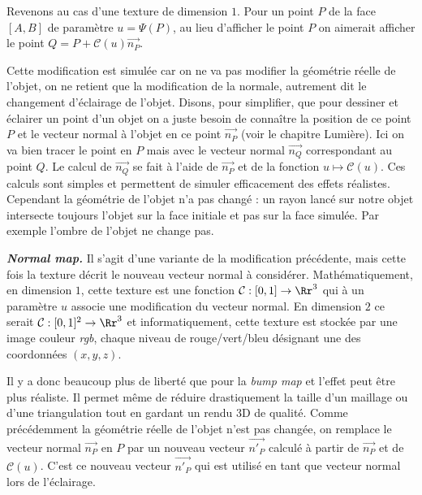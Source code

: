 \documentclass[11pt,class=report,crop=false]{standalone}
\begin{document}
Revenons au cas d'une texture de dimension $1$. Pour un point $P$ de la face $[A,B]$ de paramètre $u=\Psi(P)$, au lieu d'afficher le point $P$ on aimerait afficher le point $Q = P + \mathcal{C}(u) \vec{n_P}$.





Cette modification est \og{}simulée\fg{} car on ne va pas modifier la géométrie réelle de l'objet, on ne retient que la modification de la normale, autrement dit le changement d'éclairage de l'objet.
Disons, pour simplifier, que pour dessiner et éclairer un point d'un objet on a juste besoin de connaître la position de ce point $P$ et le vecteur normal à l'objet en ce point $\vec{n_P}$ (voir le chapitre \og{}Lumière\fg{}).
Ici on va bien tracer le point en $P$ mais avec le vecteur normal $\vec{n_{Q}}$ correspondant au point $Q$. 
Le calcul de  $\vec{n_{Q}}$ se fait à l'aide de $\vec{n_P}$ et de la fonction $u \mapsto \mathcal{C}(u)$.
Ces calculs sont simples et permettent de simuler efficacement des effets réalistes. 
Cependant la géométrie de l'objet n'a pas changé : un rayon lancé sur notre objet  intersecte toujours l'objet sur la face initiale et pas sur la face simulée.
Par exemple l'ombre de l'objet ne change pas.



\medskip

\textbf{\emph{Normal map.}}
Il s'agit d'une variante de la modification précédente, mais cette fois la texture décrit le nouveau vecteur normal à considérer.
Mathématiquement, en dimension $1$,  cette texture est une fonction $\mathcal{C} : [0,1] \to \Rr^3$ qui à un paramètre $u$ associe une modification du vecteur normal.
En dimension $2$ ce serait $\mathcal{C} : [0,1]^2 \to \Rr^3$ et informatiquement, cette texture est stockée par une image couleur \emph{rgb}, chaque niveau de rouge/vert/bleu désignant une des coordonnées $(x,y,z)$. 

Il y a donc beaucoup plus de liberté que pour la \emph{bump map}
et l'effet peut être plus réaliste. Il permet même de réduire drastiquement la taille d'un maillage ou d'une triangulation tout en gardant un rendu 3D de qualité.
Comme précédemment la géométrie réelle de l'objet n'est pas changée, on remplace le vecteur normal $\vec{n_P}$ en $P$ par un nouveau vecteur $\vec{n'_P}$ calculé à partir de 
$\vec{n_P}$ et de $\mathcal{C}(u)$. C'est ce nouveau vecteur $\vec{n'_P}$ qui est utilisé en tant que vecteur normal lors de l'éclairage.
\end{document}
